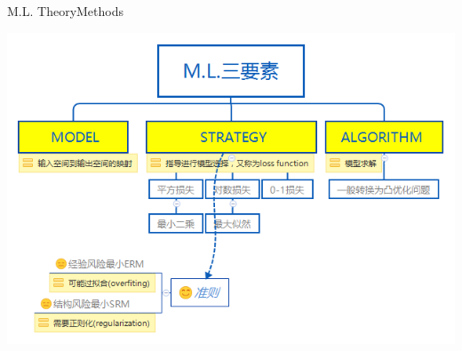 \documentclass{beamer}
\begin{document}
\begin{frame}{M.L. Theory}{\quad \quad\quad Methods}

\includegraphics[scale=.45]{fig/charcter.png}

\end{frame}

\end{document}

